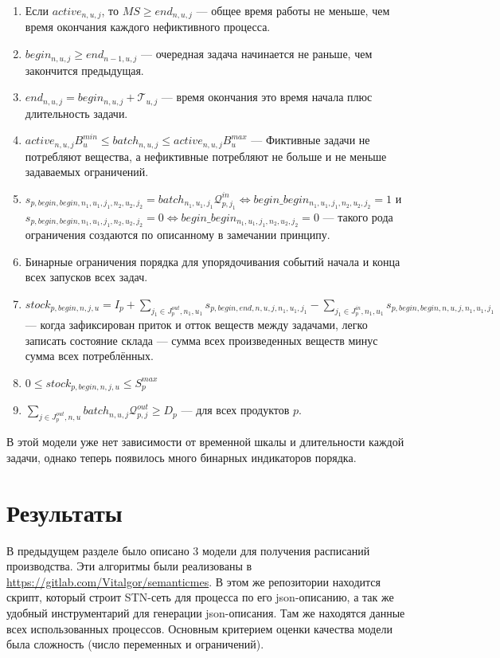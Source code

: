 \documentclass[12pt, twoside]{article}
\theoremstyle{definition}
\newcommand{\Tau}{\mathcal{T}}
\begin{document}
\begin{enumerate}
	\item Если $active_{n, u, j}$, то $MS \geq end_{n, u, j}$ --- общее время работы не меньше, чем время окончания каждого нефиктивного процесса.
	\item $begin_{n, u, j} \geq end_{n-1, u, j}$ --- очередная задача начинается не раньше, чем закончится предыдущая.
	\item $end_{n, u, j} = begin_{n, u, j} + \Tau_{u, j}$ --- время окончания это время начала плюс длительность задачи.
	\item $active_{n, u, j}B^{min}_u \leq batch_{n, u, j} \leq active_{n, u, j}B^{max}_u$ --- Фиктивные задачи не потребляют вещества, а нефиктивные потребляют не больше и не меньше задаваемых ограничений.
	\item $s_{p, begin, begin, n_1, u_1, j_1, n_2, u_2, j_2} = batch_{n_1, u_1, j_1}\mathcal{Q}^{in}_{p, j_1} \Leftrightarrow begin\_begin_{n_1, u_1, j_1, n_2, u_2, j_2} = 1$ и $s_{p, begin, begin, n_1, u_1, j_1, n_2, u_2, j_2} = 0 \Leftrightarrow begin\_begin_{n_1, u_1, j_1, n_2, u_2, j_2} = 0$ --- такого рода ограничения создаются по описанному в замечании принципу.
	\item Бинарные ограничения порядка для упорядочивания событий начала и конца всех запусков всех задач.
	\item $stock_{p, begin, n, j, u} = I_p + \displaystyle\sum_{j_1 \in J^{out}_p, n_1, u_1} s_{p, begin, end, n, u, j, n_1, u_1, j_1} - \displaystyle\sum_{j_1 \in J^{in}_p, n_1, u_1} s_{p, begin, begin, n, u, j, n_1, u_1, j_1}$ --- когда зафиксирован приток и отток веществ между задачами, легко записать состояние склада --- сумма всех произведенных веществ минус сумма всех потреблённых.
	\item $0 \leq stock_{p, begin, n, j, u} \leq S^{max}_p$
	\item $\displaystyle\sum_{j \in J^{out}_p, n, u} batch_{n, u, j} \mathcal{Q}^{out}_{p, j} \geq D_p$ --- для всех продуктов $p$.
\end{enumerate}

В этой модели уже нет зависимости от временной шкалы и длительности каждой задачи, однако теперь появилось много бинарных индикаторов порядка.

\section{Результаты}

В предыдущем разделе было описано 3 модели для получения расписаний производства. Эти алгоритмы были реализованы в \url{https://gitlab.com/Vitalgor/semanticmes}. В этом же репозитории находится скрипт, который строит STN-сеть для процесса по его json-описанию, а так же удобный инструментарий для генерации json-описания. Там же находятся данные всех использованных процессов. Основным критерием оценки качества модели была сложность (число переменных и ограничений).
\end{document}
